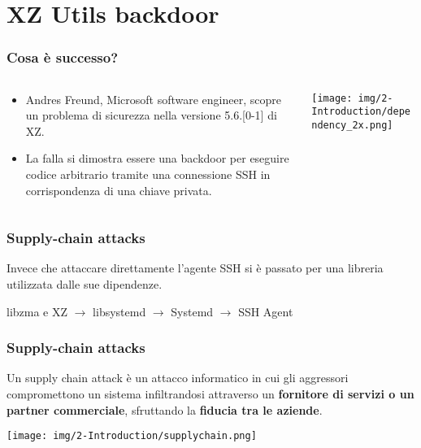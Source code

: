 
\section{XZ Utils backdoor} %


\begin{frame}
\frametitle{Cosa è successo?}

\begin{columns}
        \begin{column}{0.5\textwidth}
            \begin{itemize}
                \item Andres Freund, Microsoft software engineer, scopre un problema di sicurezza nella versione 5.6.[0-1] di XZ.
                \item La falla si dimostra essere una backdoor per eseguire codice arbitrario tramite una connessione SSH in corrispondenza di una chiave privata.
            \end{itemize}
        \end{column}
        \begin{column}{0.5\textwidth}
            \centering
            \texttt{[image: img/2-Introduction/dependency\_2x.png]}
        \end{column}
\end{columns}

\end{frame}


\begin{frame}
\frametitle{Supply-chain attacks}
Invece che attaccare direttamente l'agente SSH si è passato per una libreria utilizzata dalle sue dipendenze.

\vspace{1 cm}
\centering
    libzma e XZ $\rightarrow$ libsystemd $\rightarrow$ Systemd $\rightarrow$ SSH Agent

\end{frame}

\begin{frame}
\frametitle{Supply-chain attacks}

Un supply chain attack è un attacco informatico in cui gli aggressori 
compromettono un sistema infiltrandosi attraverso un \textbf{fornitore di servizi o 
un partner commerciale}, sfruttando la \textbf{fiducia tra le aziende}.

\texttt{[image: img/2-Introduction/supplychain.png]}
\end{frame}


